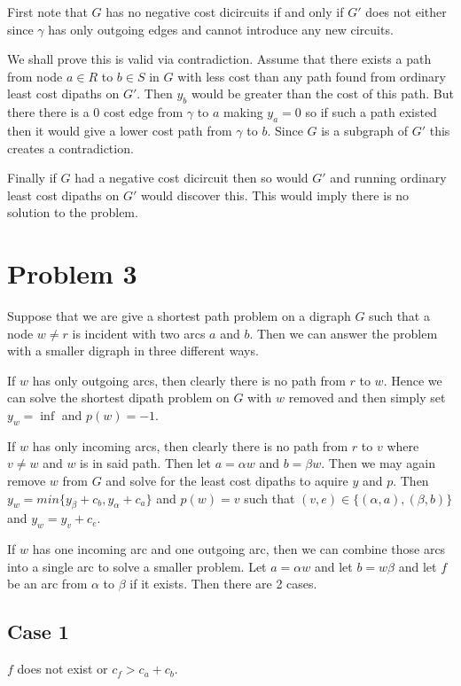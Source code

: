 \documentclass{article}
\begin{document}
First note that $G$ has no negative cost dicircuits if and only if $G'$ does not either since $\gamma$ has only outgoing edges and cannot introduce any new circuits.

We shall prove this is valid via contradiction. Assume that there exists a path from node $a \in R$ to $b \in S$ in $G$ with less cost than any path found from ordinary least cost dipaths on $G'$. Then $y_b$ would be greater than the cost of this path. But there there is a 0 cost edge from $\gamma$ to $a$ making $y_a = 0$ so if such a path existed then it would give a lower cost path from $\gamma$ to $b$. Since $G$ is a subgraph of $G'$ this creates a contradiction. 

Finally if $G$ had a negative cost dicircuit then so would $G'$ and running ordinary least cost dipaths on $G'$ would discover this. This would imply there is no solution to the problem.
 
\section*{Problem 3}
Suppose that we are give a shortest path problem on a digraph $G$ such that a node $w\neq r$ is incident with two arcs $a$ and $b$. Then we can answer the problem with a smaller digraph in three different ways. 

If $w$ has only outgoing arcs, then clearly there is no path from $r$ to $w$. 
Hence we can solve the shortest dipath problem on $G$ with $w$ removed and then simply set $y_w = \inf$ and $p(w) = -1$. 

If $w$ has only incoming arcs, then clearly there is no path from $r$ to $v$ where $v \neq w$ and $w$ is in said path. Then let $a = \alpha w$ and $b = \beta w$. Then we may again remove $w$ from $G$ and solve for the least cost dipaths to aquire $y$ and $p$. 
Then $y_w = min \{ y_\beta + c_b, y_\alpha + c_a\} $ and
$p(w) = v$ such that $(v,e) \in \{(\alpha,a), (\beta,b)\}$ and $y_w = y_v + c_e$.

If $w$ has one incoming arc and one outgoing arc, then we can combine those arcs into a single arc to solve a smaller problem. Let $a = \alpha w$ and let $b = w \beta$ and let $f$ be an arc from $\alpha$ to $\beta$ if it exists. Then there are 2 cases.

\subsection*{Case 1}
$f$ does not exist or $c_f > c_a + c_b$. 
\end{document}
